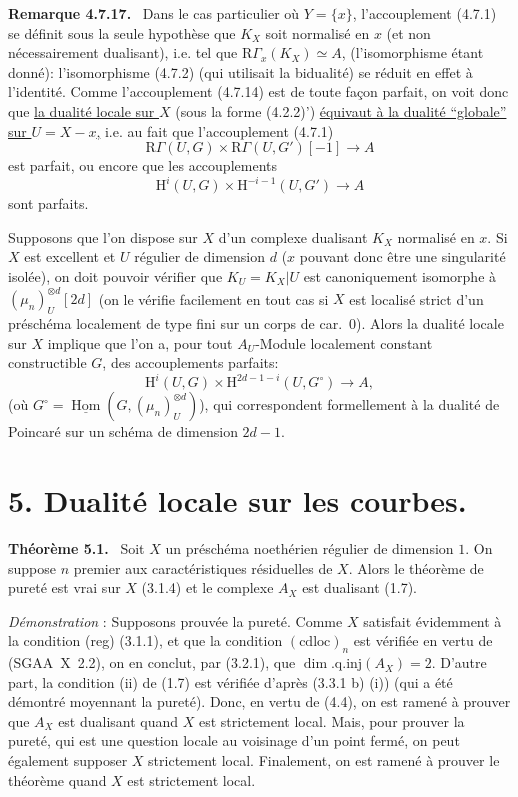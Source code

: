 \documentclass[11pt]{article}
\newenvironment{statement}[1]{\par\medskip\noindent\textbf{#1.}\ }{\par\medskip}
\renewcommand{\H}{\mathrm{H}}
\DeclareMathOperator{\Hom}{Hom}
\newcommand{\R}{\mathrm{R}}\newcommand{\RHomCore}{\mathrm{RHom}}
\providecommand{\uHom}{\underline{\Hom}}
\providecommand{\Hom}{\operatorname{Hom}}
\providecommand{\R}{\mathrm R}
\providecommand{\Hom}{\operatorname{Hom}}
\begin{document}
\begin{statement}{Remarque 4.7.17}
Dans le cas particulier où $Y=\{x\}$, l'accouplement (4.7.1) se définit sous la seule hypothèse que $K_X$ soit normalisé en $x$ (et non nécessairement dualisant), i.e. tel que $\R\Gamma_x(K_X)\simeq A$, (l'isomorphisme étant donné): l'isomorphisme (4.7.2) (qui utilisait la bidualité) se réduit en effet à l'identité. Comme l'accouplement (4.7.14) est de toute façon parfait, on voit donc que \underline{la dualité locale sur $X$} (sous la forme (4.2.2)') \underline{équivaut à la dualité ``globale'' sur $U=X-x$,} i.e. au fait que l'accouplement (4.7.1)
\[
\R\Gamma(U,G)\times\R\Gamma(U,G')[-1]\longrightarrow A
\]
est parfait, ou encore que les accouplements
\[
\H^i(U,G)\times\H^{-i-1}(U,G')\longrightarrow A
\]
sont parfaits.

Supposons que l'on dispose sur $X$ d'un complexe dualisant $K_X$ normalisé en $x$. Si $X$ est excellent et $U$ régulier de dimension $d$ ($x$ pouvant donc être une singularité isolée), on doit pouvoir vérifier que $K_U=K_X|U$ est canoniquement isomorphe à $(\mu_n)_U^{\otimes d}[2d]$ (on le vérifie facilement en tout cas si $X$ est localisé strict d'un préschéma localement de type fini sur un corps de car.~0). Alors la dualité locale sur $X$ implique que l'on a, pour tout $A_U$-Module localement constant constructible $G$, des accouplements parfaits:
\[
\H^i(U,G)\times\H^{2d-1-i}(U,G^\circ)\longrightarrow A,
\]
(où $G^\circ=\uHom(G,(\mu_n)_U^{\otimes d})$), qui correspondent formellement à la dualité de Poincaré sur un schéma de dimension $2d-1$.
\end{statement}

\section*{5. Dualité locale sur les courbes.}

\begin{statement}{Théorème 5.1}
Soit $X$ un préschéma noethérien régulier de dimension $1$. On suppose $n$ premier aux caractéristiques résiduelles de $X$. Alors le théorème de pureté est vrai sur $X$ (3.1.4) et le complexe $A_X$ est dualisant (1.7).
\end{statement}

\emph{Démonstration} : Supposons prouvée la pureté. Comme $X$ satisfait évidemment à la condition (reg) (3.1.1), et que la condition $(\mathrm{cdloc})_n$ est vérifiée en vertu de (SGAA~X~2.2), on en conclut, par (3.2.1), que $\dim.\mathrm{q.inj}(A_X)=2$. D'autre part, la condition (ii) de (1.7) est vérifiée d'après (3.3.1 b) (i)) (qui a été démontré moyennant la pureté). Donc, en vertu de (4.4), on est ramené à prouver que $A_X$ est dualisant quand $X$ est strictement local. Mais, pour prouver la pureté, qui est une question locale au voisinage d'un point fermé, on peut également supposer $X$ strictement local. Finalement, on est ramené à prouver le théorème quand $X$ est strictement local.
\end{document}
